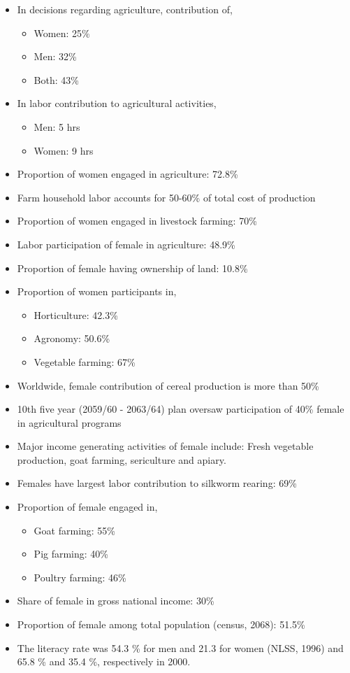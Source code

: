 \documentclass[
  openany]{book}
\providecommand{\tightlist}{%
  \setlength{\itemsep}{0pt}\setlength{\parskip}{0pt}}
\begin{document}
\begin{itemize}
\tightlist
\item
  In decisions regarding agriculture, contribution of,

  \begin{itemize}
  \tightlist
  \item
    Women: 25\%
  \item
    Men: 32\%
  \item
    Both: 43\%
  \end{itemize}
\item
  In labor contribution to agricultural activities,

  \begin{itemize}
  \tightlist
  \item
    Men: 5 hrs
  \item
    Women: 9 hrs
  \end{itemize}
\item
  Proportion of women engaged in agriculture: 72.8\%
\item
  Farm household labor accounts for 50-60\% of total cost of production
\item
  Proportion of women engaged in livestock farming: 70\%
\item
  Labor participation of female in agriculture: 48.9\%
\item
  Proportion of female having ownership of land: 10.8\%
\item
  Proportion of women participants in,

  \begin{itemize}
  \tightlist
  \item
    Horticulture: 42.3\%
  \item
    Agronomy: 50.6\%
  \item
    Vegetable farming: 67\%
  \end{itemize}
\item
  Worldwide, female contribution of cereal production is more than 50\%
\item
  10th five year (2059/60 - 2063/64) plan oversaw participation of 40\% female in agricultural programs
\item
  Major income generating activities of female include: Fresh vegetable production, goat farming, sericulture and apiary.
\item
  Females have largest labor contribution to silkworm rearing: 69\%
\item
  Proportion of female engaged in,

  \begin{itemize}
  \tightlist
  \item
    Goat farming: 55\%
  \item
    Pig farming: 40\%
  \item
    Poultry farming: 46\%
  \end{itemize}
\item
  Share of female in gross national income: 30\%
\item
  Proportion of female among total population (census, 2068): 51.5\%
\item
  The literacy rate was 54.3 \% for men and 21.3 for women (NLSS, 1996) and 65.8 \% and 35.4 \%, respectively in 2000.
\end{itemize}
\end{document}
